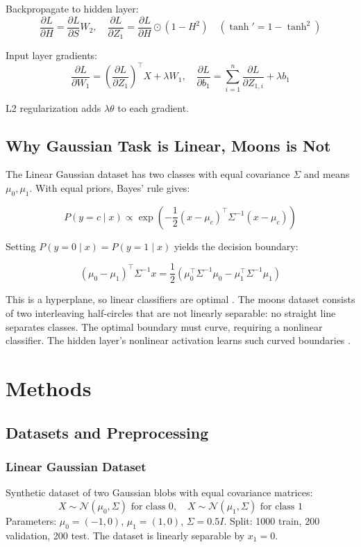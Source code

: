 \documentclass[sigconf,screen,nonacm,nofonts]{acmart}
\begin{document}
Backpropagate to hidden layer:
\[
\frac{\partial L}{\partial H} = \frac{\partial L}{\partial S} W_2,\quad
\frac{\partial L}{\partial Z_1} = \frac{\partial L}{\partial H} \odot (1 - H^2) \quad (\tanh' = 1-\tanh^2)
\]

Input layer gradients:
\[
\frac{\partial L}{\partial W_1} = \left(\frac{\partial L}{\partial Z_1}\right)^\top X + \lambda W_1,\quad
\frac{\partial L}{\partial b_1} = \sum_{i=1}^n \frac{\partial L}{\partial Z_{1,i}} + \lambda b_1
\]

L2 regularization adds $\lambda\theta$ to each gradient.

\subsection{Why Gaussian Task is Linear, Moons is Not}

The Linear Gaussian dataset has two classes with equal covariance $\Sigma$ and means $\mu_0,\mu_1$. With equal priors, Bayes' rule gives:

\[
P(y=c \mid x) \propto \exp\left(-\frac{1}{2}(x - \mu_c)^\top \Sigma^{-1} (x - \mu_c)\right)
\]

Setting $P(y=0\mid x) = P(y=1\mid x)$ yields the decision boundary:

\[
(\mu_0 - \mu_1)^\top \Sigma^{-1} x = \frac{1}{2}(\mu_0^\top \Sigma^{-1} \mu_0 - \mu_1^\top \Sigma^{-1} \mu_1)
\]

This is a hyperplane, so linear classifiers are optimal \cite{murphy2022pml}. The moons dataset consists of two interleaving half-circles that are not linearly separable: no straight line separates classes. The optimal boundary must curve, requiring a nonlinear classifier. The hidden layer's nonlinear activation learns such curved boundaries \cite{cs229dlnotes}.

\section{Methods}

\subsection{Datasets and Preprocessing}

\subsubsection{Linear Gaussian Dataset}
Synthetic dataset of two Gaussian blobs with equal covariance matrices:
\[
X \sim \mathcal{N}(\mu_0, \Sigma) \text{ for class 0}, \quad X \sim \mathcal{N}(\mu_1, \Sigma) \text{ for class 1}
\]
Parameters: \(\mu_0 = (-1,0)\), \(\mu_1 = (1,0)\), \(\Sigma = 0.5I\). Split: 1000 train, 200 validation, 200 test. The dataset is linearly separable by \(x_1 = 0\).
\end{document}
